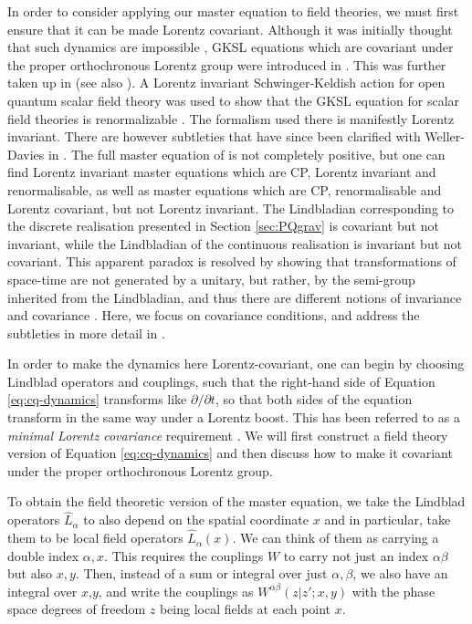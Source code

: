 \documentclass[aps,pra,showpacs,citeautoscript,amsmath,amssymb,floatfix,superscriptaddress,bbm, verbatim,amsfonts,changes,11pt,nofootinbib,longbibliography]{revtex4-2}
\def\z{{z}}
\def\L{{\hat{L}}}
\def\rate{{W}}
\def\ab{^{\alpha\beta}}
\def\rateabx{{\rate\ab(\z|\z';x,y)}}
\begin{document}
In order to consider applying our master equation to field theories, we must first ensure that it can be made Lorentz covariant.
Although it was initially thought that such dynamics are impossible \cite{srednicki-purity}, GKSL equations which are covariant under the proper orthochronous Lorentz group were introduced in  \cite{alicki-reldecoherence}. This was further taken up in  \cite{poulinKITP,OR-intrinsic} (see also  \cite{beckman2001causal}).  A Lorentz invariant Schwinger-Keldish action for open quantum scalar field theory was used to show that the GKSL equation for scalar field theories is renormalizable \cite{baidya2017renormalization}. The formalism used there is manifestly Lorentz invariant. There are however subtleties that have since been clarified with Weller-Davies in  \cite{UCLLorentz}. The full master equation of  \cite{baidya2017renormalization} is not completely positive, but one can find Lorentz invariant master equations which are CP, Lorentz invariant and renormalisable, as well as master equations which are CP, renormalisable and Lorentz covariant, but not Lorentz invariant. The Lindbladian corresponding to the discrete realisation presented in Section \ref{sec:PQgrav} is covariant but not invariant, while the Lindbladian of the continuous realisation is invariant but not covariant. This apparent paradox is resolved by showing that transformations of space-time are not generated by a unitary, but rather, by the semi-group inherited from the Lindbladian, and thus there are different notions of invariance and covariance \cite{UCLLorentz}. Here, we focus on covariance conditions, and address the subtleties in more detail in  \cite{UCLLorentz,oppenheim2023covariant}\label{ft:renorm}. 


In order to make the dynamics here Lorentz-covariant, one can begin by choosing Lindblad operators and couplings, such that the right-hand side of Equation \eqref{eq:cq-dynamics} transforms like $\partial/\partial t$, so that both sides of the equation transform
in the same way under a Lorentz boost.  This has been referred to as a {\it minimal Lorentz covariance} requirement \cite{srednicki-purity}.
We will first construct a field theory version of Equation \eqref{eq:cq-dynamics} and then discuss how to make it covariant under the proper orthochronous Lorentz group. 


To obtain the field theoretic version of the master equation, we take the Lindblad operators $\L_{\alpha}$ to also depend on the spatial coordinate $x$ and in particular, take them to be local field operators  $\L_{\alpha}(x)$. We can think of them as carrying a double index $\alpha,x$. This requires the couplings $\rate$ to carry not just an index $\alpha\beta$ but also $x,y$.
Then, instead of a sum or integral over just $\alpha,\beta$, we also have an integral over $x$,$y$, and write the couplings as $\rateabx$ with the phase space degrees of freedom $\z$ being local fields at each point $x$.
\end{document}
